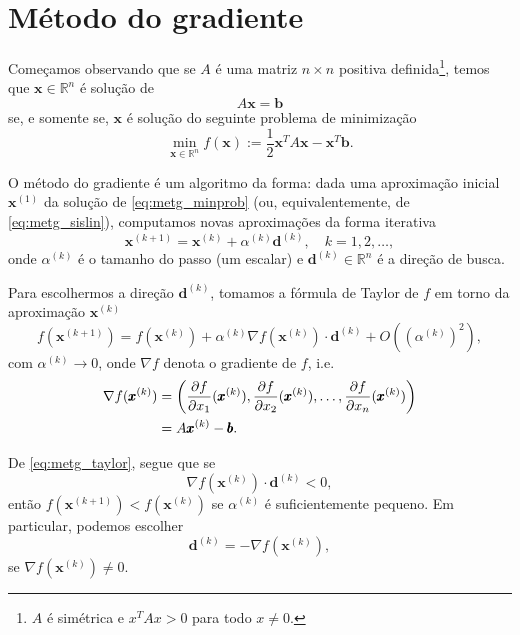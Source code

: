\section{Método do gradiente}\label{cap_sl_iter_sec_metg}

Começamos observando que se $A$ é uma matriz $n\times n$ positiva definida\footnote{$A$ é simétrica e $x^TAx > 0$ para todo $x\neq 0$.}, temos que $\pmb{x}\in\mathbb{R}^n$ é solução de
\begin{equation}\label{eq:metg_sislin}
  A\pmb{x} = \pmb{b}
\end{equation}
se, e somente se, $\pmb{x}$ é solução do seguinte problema de minimização
\begin{equation}\label{eq:metg_minprob}
  \min_{\pmb{x}\in\mathbb{R}^n}f(\pmb{x}) := \frac{1}{2}\pmb{x}^TA\pmb{x}-\pmb{x}^T\pmb{b}.
\end{equation}

O método do gradiente é um algoritmo da forma: dada uma aproximação inicial $\pmb{x}^{(1)}$ da solução de \eqref{eq:metg_minprob} (ou, equivalentemente, de \eqref{eq:metg_sislin}), computamos novas aproximações da forma iterativa
\begin{equation}
  \pmb{x}^{(k+1)} = \pmb{x}^{(k)} + \alpha^{(k)}\pmb{d}^{(k)},\quad k=1, 2, \ldots,
\end{equation}
onde $\alpha^{(k)}$ é o tamanho do passo (um escalar) e $\pmb{d}^{(k)}\in\mathbb{R}^n$ é a direção de busca.

Para escolhermos a direção $\pmb{d}^{(k)}$, tomamos a fórmula de Taylor de $f$ em torno da aproximação $\pmb{x}^{(k)}$
\begin{equation}\label{eq:metg_taylor}
  f(\pmb{x}^{(k+1)}) = f(\pmb{x}^{(k)}) + \alpha^{(k)}\nabla f(\pmb{x}^{(k)})\cdot \pmb{d}^{(k)} + O\left((\alpha^{(k)})^2\right),
\end{equation}
com $\alpha^{(k)}\to 0$, onde $\nabla f$ denota o gradiente de $f$, i.e.
\begin{align}
  \nabla f(\pmb{x}^{(k)}) &= \left(\frac{\partial f}{\partial x_1}(\pmb{x}^{(k)}), \frac{\partial f}{\partial x_2}(\pmb{x}^{(k)}), \dotsc, \frac{\partial f}{\partial x_n}(\pmb{x}^{(k)})\right)\\
  &= A\pmb{x}^{(k)}-\pmb{b}.
\end{align}


De \eqref{eq:metg_taylor}, segue que se
\begin{equation}
  \nabla f(\pmb{x}^{(k)})\cdot \pmb{d}^{(k)} < 0,
\end{equation}
então $f(\pmb{x}^{(k+1)}) < f(\pmb{x}^{(k)})$ se $\alpha^{(k)}$ é suficientemente pequeno. Em particular, podemos escolher
\begin{equation}
  \pmb{d}^{(k)} = -\nabla f(\pmb{x}^{(k)}),
\end{equation}
se $\nabla f(\pmb{x}^{(k)})\neq 0$.

